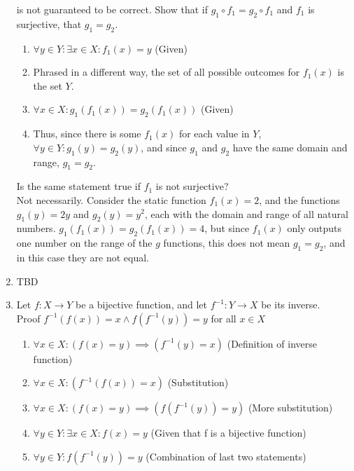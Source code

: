 \documentclass{article}
\begin{document}
\begin{enumerate}
            is not guaranteed to be correct.
            Show that if $g_1 \circ f_1 = g_2 \circ f_1$ and $f_1$ is surjective, that $g_1 = g_2$.
            \begin{enumerate}
                \item $\forall y \in Y: \exists x \in X: f_1(x) = y$ (Given)
                \item Phrased in a different way, the set of all possible outcomes for $f_1(x)$ is the set $Y$.
                \item $\forall x \in X: g_1(f_1(x)) = g_2(f_1(x))$ (Given)
                \item Thus, since there is some $f_1(x)$ for each value in $Y$,
                    $\forall y \in Y: g_1(y) = g_2(y)$, and since $g_1$ and
                    $g_2$ have the same domain and range, $g_1=g_2$.
            \end{enumerate}
            Is the same statement true if $f_1$ is not surjective? \\ 
            Not necessarily.  Consider the static function $f_1(x) = 2$, and
            the functions $g_1(y) = 2y$ and $g_2(y) = y^2$, each with the
            domain and range of all natural numbers. $g_1(f_1(x)) = g_2(f_1(x))
            = 4$, but since $f_1(x)$ only outputs one number on the range of
            the $g$ functions, this does not mean $g_1 = g_2$, and in this case
            they are not equal.
        \item TBD
        \item Let $f: X \rightarrow Y$ be a bijective function, and let
            $f^{-1}: Y \rightarrow X$ be its inverse. \\
            Proof $f^{-1}(f(x)) = x \land f(f^{-1}(y)) = y$ for all $x \in X$
            \begin{enumerate}
                \item $\forall x \in X: (f(x) = y) \implies (f^{-1}(y) = x)$ (Definition of inverse function)
                \item $\forall x \in X: (f^{-1}(f(x)) = x)$ (Substitution)
                \item $\forall x \in X: (f(x) = y) \implies (f(f^{-1}(y)) = y)$ (More substitution)
                \item $\forall y \in Y: \exists x \in X: f(x) = y$ (Given that f is a bijective function)
                \item $\forall y \in Y: f(f^{-1}(y)) = y$ (Combination of last two statements)
            \end{enumerate}

\end{enumerate}
\end{document}
